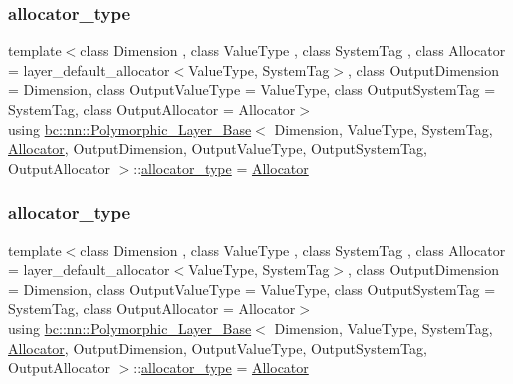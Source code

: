 \subsubsection{\texorpdfstring{allocator\+\_\+type}{allocator\_type}\hspace{0.1cm}{\footnotesize\ttfamily [1/2]}}
{\footnotesize\ttfamily template$<$class Dimension , class Value\+Type , class System\+Tag , class Allocator  = layer\+\_\+default\+\_\+allocator$<$\+Value\+Type, System\+Tag$>$, class Output\+Dimension  = Dimension, class Output\+Value\+Type  = Value\+Type, class Output\+System\+Tag  = System\+Tag, class Output\+Allocator  = Allocator$>$ \\
using \hyperlink{structbc_1_1nn_1_1Polymorphic__Layer__Base}{bc\+::nn\+::\+Polymorphic\+\_\+\+Layer\+\_\+\+Base}$<$ Dimension, Value\+Type, System\+Tag, \hyperlink{classbc_1_1allocators_1_1Allocator}{Allocator}, Output\+Dimension, Output\+Value\+Type, Output\+System\+Tag, Output\+Allocator $>$\+::\hyperlink{structbc_1_1nn_1_1Polymorphic__Layer__Base_a1414f8c37dea6254aebf63e4486ed818}{allocator\+\_\+type} =  \hyperlink{classbc_1_1allocators_1_1Allocator}{Allocator}}

\mbox{\label{structbc_1_1nn_1_1Polymorphic__Layer__Base_a1414f8c37dea6254aebf63e4486ed818}} 
\subsubsection{\texorpdfstring{allocator\+\_\+type}{allocator\_type}\hspace{0.1cm}{\footnotesize\ttfamily [2/2]}}
{\footnotesize\ttfamily template$<$class Dimension , class Value\+Type , class System\+Tag , class Allocator  = layer\+\_\+default\+\_\+allocator$<$\+Value\+Type, System\+Tag$>$, class Output\+Dimension  = Dimension, class Output\+Value\+Type  = Value\+Type, class Output\+System\+Tag  = System\+Tag, class Output\+Allocator  = Allocator$>$ \\
using \hyperlink{structbc_1_1nn_1_1Polymorphic__Layer__Base}{bc\+::nn\+::\+Polymorphic\+\_\+\+Layer\+\_\+\+Base}$<$ Dimension, Value\+Type, System\+Tag, \hyperlink{classbc_1_1allocators_1_1Allocator}{Allocator}, Output\+Dimension, Output\+Value\+Type, Output\+System\+Tag, Output\+Allocator $>$\+::\hyperlink{structbc_1_1nn_1_1Polymorphic__Layer__Base_a1414f8c37dea6254aebf63e4486ed818}{allocator\+\_\+type} =  \hyperlink{classbc_1_1allocators_1_1Allocator}{Allocator}}

